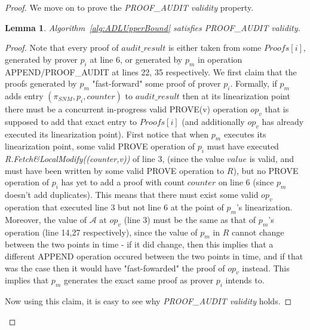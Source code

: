 \documentclass[11pt]{article}
\newtheorem{lemma}{Lemma}
\theoremstyle{definition}
\begin{document}
\begin{proof}
    We move on to prove the \textit{PROOF\_AUDIT validity} property.

    \begin{lemma}
        Algorithm~\ref{alg:ADLUpperBound} satisfies \textit{PROOF\_AUDIT validity}. 
    \end{lemma}

    \begin{proof}
        Note that every proof of $audit\_result$ is either taken from some $Proofs[i]$, generated by prover $p_i$ at line 6, or generated by $p_m$ in operation APPEND/PROOF\_AUDIT at lines 22, 35 respectively. We first claim that the proofs generated by $p_m$ "fast-forward" some proof of prover $p_i$. Formally, if $p_m$ adds entry $(\pi_{SNM},p_i,counter)$ to $audit\_result$ then at its linearization point there must be a concurrent in-progress valid  PROVE(v) operation $op_v$ that is supposed to add that exact entry to $Proofs[i]$ (and additionally $op_v$ has already executed its linearization point). First notice that when $p_m$ executes its linearization point, some valid PROVE operation of $p_i$ must have executed \textit{R.Fetch\&LocalModify((counter,v))} of line 3, (since the value $value$ is valid, and must have been written by some valid PROVE operation to $R$), but no PROVE operation of $p_i$ has yet to add a proof with count $counter$ on line 6 (since $p_m$ doesn't add duplicates). This means that there must exist some valid $op_v$ operation that executed line 3 but not line 6 at the point of $p_m$'s linearization. Moreover, the value of $\mathcal{A}$ at $op_v$ (line 3) must be the same as that of $p_m$'s operation (line 14,27 respectively), since the value of $p_m$ in $R$ cannot change between the two points in time - if it did change, then this implies that a different APPEND operation occured between the two points in time, and if that was the case then it would have "fast-fowarded" the proof of $op_v$ instead. This implies that $p_m$ generates the exact same proof as prover $p_i$ intends to.

        Now using this claim, it is easy to see why  \textit{PROOF\_AUDIT validity} holds.
        

\end{proof}
\end{proof}
\end{document}
